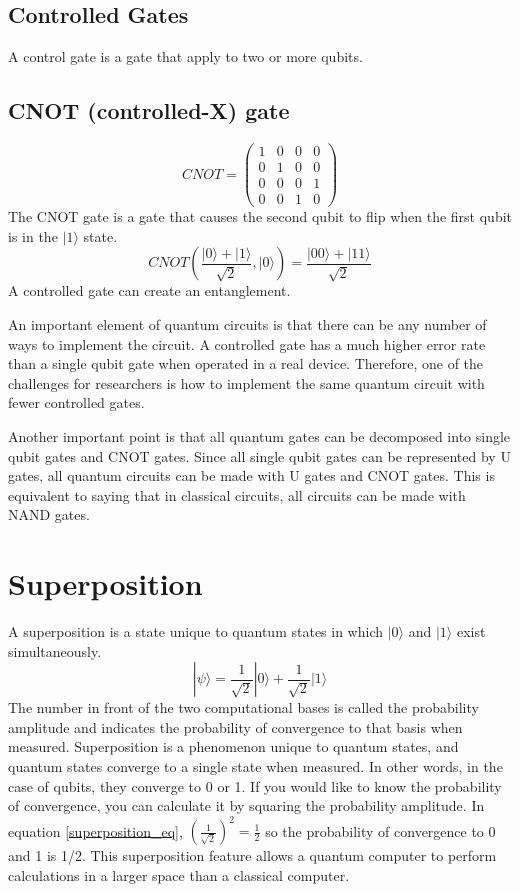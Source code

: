 \subsection{Controlled Gates}
A control gate is a gate that apply to two or more qubits\cite{qgate}.
\subsection*{CNOT (controlled-X) gate}
\begin{equation}
    CNOT = 
    \begin{pmatrix}
        1 & 0 & 0 & 0\\
        0 & 1 & 0 & 0\\
        0 & 0 & 0 & 1\\
        0 & 0 & 1 & 0
    \end{pmatrix}
\end{equation}
The CNOT gate is a gate that causes the second qubit to flip when the first qubit is in the $|1\rangle$ state.
\begin{equation}
    CNOT(\frac{|0\rangle + |1\rangle}{\sqrt{2}}, |0\rangle) = \frac{|00\rangle + |11\rangle}{\sqrt{2}}
\end{equation}
A controlled gate can create an entanglement.

An important element of quantum circuits is that there can be any number of ways to implement the circuit.
A controlled gate has a much higher error rate than a single qubit gate when operated in a real device.
Therefore, one of the challenges for researchers is how to implement the same quantum circuit with fewer controlled gates.

Another important point is that all quantum gates can be decomposed into single qubit gates and CNOT gates.
Since all single qubit gates can be represented by U gates, all quantum circuits can be made with U gates and CNOT gates.
This is equivalent to saying that in classical circuits, all circuits can be made with NAND gates.

\section{Superposition}
\label{superposition}
A superposition is a state unique to quantum states in which $|0\rangle$ and $|1\rangle$ exist simultaneously.
\begin{equation}
    \label{superposition_eq}
    |\psi\rangle =  \frac{1}{\sqrt{2}}|0\rangle + \frac{1}{\sqrt{2}}|1\rangle
\end{equation}
The number in front of the two computational bases is called the probability amplitude and indicates the probability of convergence to that basis when measured.
Superposition is a phenomenon unique to quantum states, and quantum states converge to a single state when measured. 
In other words, in the case of qubits, they converge to 0 or 1.
If you would like to know the probability of convergence, you can calculate it by squaring the probability amplitude.
In equation \ref{superposition_eq}, $(\frac{1}{\sqrt{2}})^2 = \frac{1}{2}$ so the probability of convergence to 0 and 1 is 1/2.
This superposition feature allows a quantum computer to perform calculations in a larger space than a classical computer.

